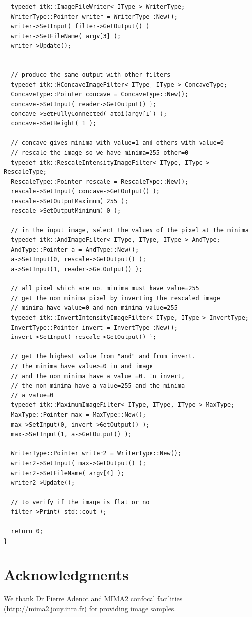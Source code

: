 \documentclass{llncs}
\begin{document}
\begin{lstlisting}
  typedef itk::ImageFileWriter< IType > WriterType;
  WriterType::Pointer writer = WriterType::New();
  writer->SetInput( filter->GetOutput() );
  writer->SetFileName( argv[3] );
  writer->Update();


  // produce the same output with other filters
  typedef itk::HConcaveImageFilter< IType, IType > ConcaveType;
  ConcaveType::Pointer concave = ConcaveType::New();
  concave->SetInput( reader->GetOutput() );
  concave->SetFullyConnected( atoi(argv[1]) );
  concave->SetHeight( 1 );

  // concave gives minima with value=1 and others with value=0
  // rescale the image so we have minima=255 other=0
  typedef itk::RescaleIntensityImageFilter< IType, IType > RescaleType;
  RescaleType::Pointer rescale = RescaleType::New();
  rescale->SetInput( concave->GetOutput() );
  rescale->SetOutputMaximum( 255 );
  rescale->SetOutputMinimum( 0 );

  // in the input image, select the values of the pixel at the minima
  typedef itk::AndImageFilter< IType, IType, IType > AndType;
  AndType::Pointer a = AndType::New();
  a->SetInput(0, rescale->GetOutput() );
  a->SetInput(1, reader->GetOutput() );

  // all pixel which are not minima must have value=255
  // get the non minima pixel by inverting the rescaled image
  // minima have value=0 and non minima value=255
  typedef itk::InvertIntensityImageFilter< IType, IType > InvertType;
  InvertType::Pointer invert = InvertType::New();
  invert->SetInput( rescale->GetOutput() );

  // get the highest value from "and" and from invert. 
  // The minima have value>=0 in and image
  // and the non minima have a value =0. In invert, 
  // the non minima have a value=255 and the minima
  // a value=0
  typedef itk::MaximumImageFilter< IType, IType, IType > MaxType;
  MaxType::Pointer max = MaxType::New();
  max->SetInput(0, invert->GetOutput() );
  max->SetInput(1, a->GetOutput() );

  WriterType::Pointer writer2 = WriterType::New();
  writer2->SetInput( max->GetOutput() );
  writer2->SetFileName( argv[4] );
  writer2->Update();

  // to verify if the image is flat or not
  filter->Print( std::cout );

  return 0;
}
\end{lstlisting}

\section{Acknowledgments}
We thank Dr Pierre Adenot and MIMA2 confocal facilities (http://mima2.jouy.inra.fr)
for providing image samples.
\end{document}
